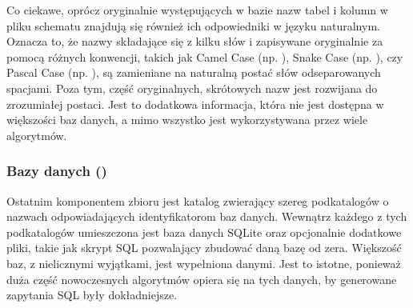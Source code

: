 Co ciekawe, oprócz oryginalnie występujących w bazie nazw tabel i kolumn w pliku schematu znajdują się również ich odpowiedniki w języku naturalnym. Oznacza to, że nazwy składające się z kilku słów i zapisywane oryginalnie za pomocą różnych konwencji, takich jak Camel Case (np. ), Snake Case (np. ), czy Pascal Case (np. ), są zamieniane na naturalną postać słów odseparowanych spacjami. Poza tym, część oryginalnych, skrótowych nazw jest rozwijana do zrozumiałej postaci. Jest to dodatkowa informacja, która nie jest dostępna w większości baz danych, a mimo wszystko jest wykorzystywana przez wiele algorytmów.



\subsubsection{Bazy danych ()}
Ostatnim komponentem zbioru  jest katalog  zwierający szereg podkatalogów o nazwach odpowiadających identyfikatorom baz danych. Wewnątrz każdego z tych podkatalogów umieszczona jest baza danych SQLite oraz opcjonalnie dodatkowe pliki, takie jak skrypt SQL pozwalający zbudować daną bazę od zera. Większość baz, z nielicznymi wyjątkami, jest wypełniona danymi. Jest to istotne, ponieważ duża część nowoczesnych algorytmów opiera się na tych danych, by generowane zapytania SQL były dokładniejsze.



